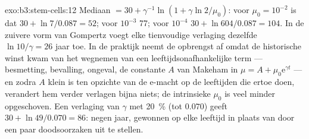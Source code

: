 \begin{solution}{exo:b3:stem-cells:12}
Mediaan $= 30 + \gamma^{-1}\ln(1 + \gamma\ln 2/\mu_{0})$: voor $\mu_{0} =
10^{-2}$ is dat $30 + \ln 7/0.087 = 52$; voor $10^{-3}$ 77; voor
$10^{-4}$ $30 +
\ln 604/0.087 = 104$. In de zuivere vorm van Gompertz voegt elke
tienvoudige verlaging dezelfde $\ln 10/\gamma = 26$ jaar toe. In de
praktijk neemt de opbrengst af omdat de historische winst kwam van het
wegnemen van een leeftijdsonafhankelijke term --- besmetting,
bevalling, ongeval, de constante $A$ van Makeham in $\mu = A
+ \mu_{0}\mathrm{e}^{\gamma t}$ --- en zodra $A$ klein is ten opzichte
van de e-macht op de leeftijden die ertoe doen, verandert hem verder
verlagen bijna niets; de intrinsieke $\mu_{0}$ is veel minder
opgeschoven. Een verlaging van $\gamma$ met \qty{20}{\%} (tot $0.070$)
geeft $30 + \ln 49/0.070 = 86$: negen jaar, gewonnen op elke leeftijd
in plaats van door een paar doodsoorzaken uit te stellen.
\end{solution}

